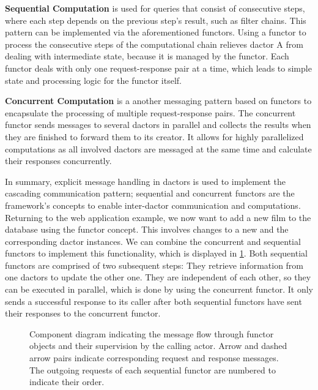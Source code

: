       \textbf{Sequential Computation} is used for queries that consist of consecutive steps, where each step depends on the previous step's result, such as filter chains.
      This pattern can be implemented via the aforementioned \glspl{functor}.
      Using a \gls{functor} to process the consecutive steps of the computational chain relieves \gls{dactor} A from dealing with intermediate state, because it is managed by the \gls{functor}.
      Each \gls{functor} deals with only one request-response pair at a time, which leads to simple state and processing logic for the \gls{functor} itself.

      \textbf{Concurrent Computation} is a another messaging pattern based on \glspl{functor} to encapsulate the processing of multiple request-response pairs.
      The concurrent \gls{functor} sends messages to several \glspl{dactor} in parallel and collects the results when they are finished to forward them to its creator.
      It allows for highly parallelized computations as all involved \glspl{dactor} are messaged at the same time and calculate their responses concurrently.
      
    In summary, explicit message handling in \glspl{dactor} is used to implement the cascading communication pattern; sequential and concurrent \glspl{functor} are the framework's concepts to enable inter-\gls{dactor} communication and computations.
    Returning to the web application example, we now want to add a new film to the database using the \gls{functor} concept.
    This involves changes to a new  and the corresponding  \gls{dactor} instances.
    We can combine the concurrent and sequential \glspl{functor} to implement this functionality, which is displayed in \cref{fig:functor_diagram}.
    Both sequential \glspl{functor} are comprised of two subsequent steps:
    They retrieve information from one \glspl{dactor} to update the other one.
    They are independent of each other, so they can be executed in parallel, which is done by using the concurrent \gls{functor}.
    It only sends a successful response to its caller after both sequential \glspl{functor} have sent their responses to the concurrent \gls{functor}.
    
    \begin{figure}
      \centering
      
      \caption{Component diagram indicating the message flow through \gls{functor} objects and their supervision by the calling actor. Arrow and dashed arrow pairs indicate corresponding request and response messages. The outgoing requests of each sequential \gls{functor} are numbered to indicate their order.}
      \label{fig:functor_diagram}
    \end{figure}      
      
